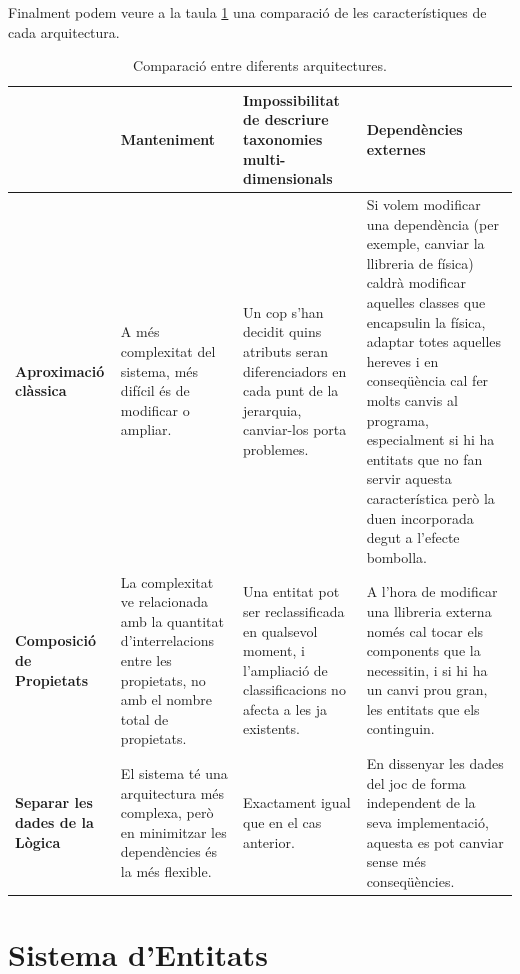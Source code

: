 Finalment podem veure a la taula \ref{tab:comparacioFilosofies} una comparació de les característiques de cada arquitectura.

\begin{table}
  \begin{tabular}{ | p{} | p{} | p{} | p{} | }
    \hline
     &
     {\bf Manteniment} &
     {\bf Impossibilitat de descriure taxonomies multi-dimensionals} &
     {\bf Dependències externes} \\
     \hline
     
     {\bf Aproximació clàssica} &
     A més complexitat del sistema, més difícil és de modificar o ampliar. &
     Un cop s'han decidit quins atributs seran diferenciadors en cada punt de la jerarquia, canviar-los porta problemes. &
     Si volem modificar una dependència (per exemple, canviar la llibreria de física) caldrà modificar aquelles classes que encapsulin la física, adaptar totes aquelles hereves i en conseqüència cal fer molts canvis al programa, especialment si hi ha entitats que no fan servir aquesta característica però la duen incorporada degut a l'efecte bombolla.\\
     \hline
     
     {\bf Composició de Propietats} &
     La complexitat ve relacionada amb la quantitat d'interrelacions entre les propietats, no amb el nombre total de propietats. &
     Una entitat pot ser reclassificada en qualsevol moment, i l'ampliació de classificacions no afecta a les ja existents. &
     A l'hora de modificar una llibreria externa només cal tocar els components que la necessitin, i si hi ha un canvi prou gran, les entitats que els continguin. \\
     \hline
     
     {\bf Separar les dades de la Lògica} &
     El sistema té una arquitectura més complexa, però en minimitzar les dependències és la més flexible. &
     Exactament igual que en el cas anterior. &
     En dissenyar les dades del joc de forma independent de la seva implementació, aquesta es pot canviar sense més conseqüències. \\
     \hline
  \end{tabular}
  \caption{Comparació entre diferents arquitectures. \label{tab:comparacioFilosofies}}
\end{table}

\section{Sistema d'Entitats}

